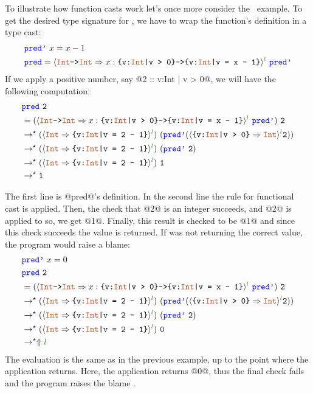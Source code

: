 To illustrate how function casts work let's once more consider 
the \predname\ example.
%
To get the desired type signature for \predname, 
we have to wrap the function's definition 
in a type cast:
\begin{align*}
& \prednamep\ x= x - 1 \\
& \predname  = \ecast{\tyint \texttt{->} \tyint}{x:\ttpos \texttt{->} \ttpred{x}}{l} \ \prednamep
\end{align*}
If we apply a positive number, say @2 :: {v:Int | v > 0}@, we will have the following computation:
%
\begin{align*}
&\predname\ \texttt{2}\\
&=(\ecast{\tyint \texttt{->} \tyint}{x:\ttpos \texttt{->} \ttpred{x}}{l} \ \prednamep)\ \texttt{2} \\
&\rightarrow^\star (\ecast{\tyint}{\ttpred{2}}{l}) \ (\prednamep(\ecast{\ttpos}{\tyint}{l}\texttt{2})) \\ 
&\rightarrow^\star (\ecast{\tyint}{\ttpred{2}}{l}) \ (\prednamep\ \texttt{2}) \\ 
&\rightarrow^\star (\ecast{\tyint}{\ttpred{2}}{l}) \ \texttt{1} \\ 
&\rightarrow^\star \texttt{1} \\ 
\end{align*}

The first line is @pred@'s definition. In the second line the rule for functional cast is applied.
Then, the check that @2@ is an integer succeeds, and @2@ is applied to \prednamep
so, we get @1@.
Finally, this result is checked to be @1@ and since this check succeeds the value is returned.
%
If \prednamep was not returning the correct value, the program would raise a blame:
\begin{align*}
&\prednamep\ x= 0 \\
&\predname\ \texttt{2} \\
&=(\ecast{\tyint \texttt{->} \tyint}{x:\ttpos \texttt{->} \ttpred{x}}{l} \ \prednamep)\ \texttt{2} \\
&\rightarrow^\star (\ecast{\tyint}{\ttpred{2}}{l}) \ (\prednamep(\ecast{\ttpos}{\tyint}{l}\texttt{2})) \\ 
&\rightarrow^\star (\ecast{\tyint}{\ttpred{2}}{l}) \ (\prednamep\ \texttt{2}) \\ 
&\rightarrow^\star (\ecast{\tyint}{\ttpred{2}}{l}) \ \texttt{0} \\ 
&\rightarrow^\star \elabel{l} \\ 
\end{align*}
The evaluation is the same as in the previous example, 
up to the point where the \prednamep application returns.
Here, the application returns @0@, thus the final check fails 
and the program raises the blame {}.

